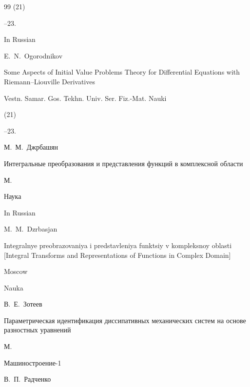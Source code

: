 \begin{thebibliography}{99}
(21)

--23.



\misctransl

\lang In Russian

\by E.~N.~Ogorodnikov

\paper Some Aspects of Initial Value Problems  Theory for Differential Equations with  Riemann--Liouville Derivatives

\jour Vestn. Samar. Gos. Tekhn. Univ. Ser. Fiz.-Mat. Nauki


(21)

--23.






\by М.~М.~Джрбашян

\book Интегральные преобразования и представления функций в комплексной области

\publaddr М.

\publ Наука



\misctransl

\lang In Russian

\by M.~M.~Dzrbasjan


\book  Integralnye preobrazovaniya i predstavleniya funktsiy v kompleksnoy oblasti \rm [Integral Transforms and Representations of Functions in Complex Domain]

\publaddr Moscow

\publ Nauka









\by В.~Е.~Зотеев

\book Параметрическая идентификация диссипативных механических систем на основе разностных уравнений

\publaddr М.

\publ \mbox{Машиностроение-1}


\ed В.~П.~Радченко



\end{thebibliography}
